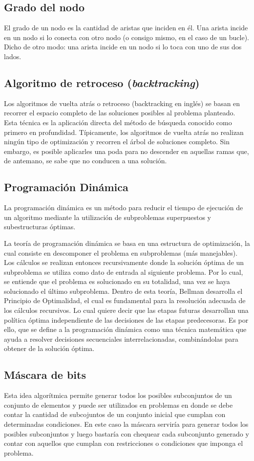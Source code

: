 \subsection{Grado del nodo}
El grado de un nodo es la cantidad de aristas que inciden en él. Una arista incide en un nodo si lo conecta con otro nodo (o consigo mismo, en el caso de un bucle). Dicho de otro modo: una arista incide en un nodo si lo toca con uno de sus dos lados.

\subsection{Algoritmo de retroceso (\emph{backtracking})}
Los algoritmos de vuelta atrás o retroceso (backtracking en inglés) se basan en recorrer el espacio completo de las soluciones posibles al problema planteado. Esta técnica es la aplicación directa del método de búsqueda conocido como primero en profundidad. Típicamente, los algoritmos de vuelta atrás no realizan ningún tipo de optimización y recorren el árbol de soluciones completo. Sin embargo, es posible aplicarles una poda para no descender en aquellas ramas que, de antemano, se sabe que no conducen a una solución. 

\subsection{Programación Dinámica}
La programación dinámica es un método para reducir el tiempo de ejecución de un algoritmo
mediante la utilización de subproblemas superpuestos y subestructuras óptimas.

La teoría de programación dinámica se basa en una estructura de optimización, la cual consiste
en descomponer el problema en subproblemas (más manejables). Los cálculos se realizan entonces recursivamente donde la solución óptima de un subproblema se utiliza como dato de entrada
al siguiente problema. Por lo cual, se entiende que el problema es solucionado en su totalidad,
una vez se haya solucionado el último subproblema. Dentro de esta teoría, Bellman desarrolla el
Principio de Optimalidad, el cual es fundamental para la resolución adecuada de los cálculos recursivos. Lo cual quiere decir que las etapas futuras desarrollan una política óptima independiente
de las decisiones de las etapas predecesoras. Es por ello, que se define a la programación dinámica como una técnica matemática que ayuda a resolver decisiones secuenciales interrelacionadas,
combinándolas para obtener de la solución óptima.

\subsection{Máscara de bits}
Esta idea algorítmica permite generar todos los posibles subconjuntos de un conjunto de elementos y puede ser utilizados en problemas en donde se debe contar la cantidad de subcojuntos de un conjunto inicial que cumplan con determinadas condiciones. En este caso la máscara serviría para generar todos los posibles subconjuntos y luego bastaría con chequear cada subconjunto generado y contar con aquellos que cumplan con restricciones o condiciones que imponga el problema.